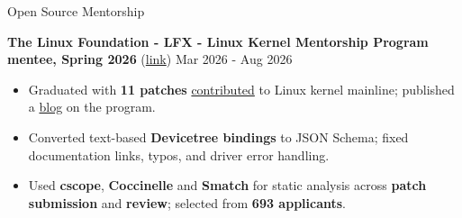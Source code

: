 \documentclass{resume} %
\begin{document}
\begin{rSection}{Open Source Mentorship}

\vspace{-1.25em}
\item \textbf{The Linux Foundation - LFX - Linux Kernel Mentorship Program mentee, Spring 2026} (\href{https://mentorship.lfx.linuxfoundation.org/project/53378ec5-48d7-4c49-a01f-8cbd3948db3d}{link}) \hfill {Mar 2026 - Aug 2026}
\begin{itemize}
\setlength\itemsep{-0.6em}
    \item Graduated with \textbf{11 patches} \href{https://git.kernel.org/pub/scm/linux/kernel/git/torvalds/linux.git/log/?qt=grep&q=ninadnaik07%40gmail.com}{contributed} to Linux kernel mainline; published a \href{https://tech.ninadnaik.me/lfx-lkmp}{blog} on the program.
    \item Converted text-based \textbf{Devicetree bindings} to JSON Schema; fixed documentation links, typos, and driver error handling.
    \item Used \textbf{cscope}, \textbf{Coccinelle} and \textbf{Smatch} for static analysis across \textbf{patch submission} and \textbf{review}; selected from \textbf{693 applicants}.
\end{itemize}

\end{rSection}

\end{document}
